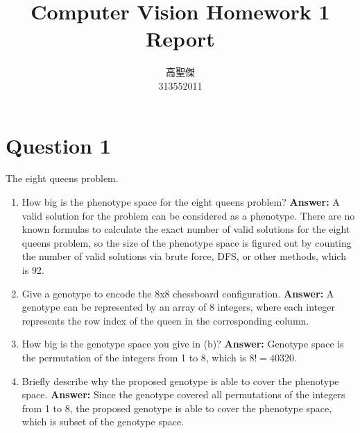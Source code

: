 \documentclass[12pt,letterpaper]{article}
\newcommand{\xAns}{\vskip 2mm\textbf{Answer:} }
\begin{document}
\begin{CJK}{UTF8}{bkai}
    \title{Computer Vision Homework 1 Report}

    \author{
        高聖傑\\
        313552011\\
    }

    \maketitle
\end{CJK}

\section*{Question 1}
The eight queens problem.
\begin{enumerate}[label=(\alph*)]
    \item How big is the phenotype space for the eight queens problem? \xAns A valid solution for the problem can be considered as a phenotype. There are no known formulas to calculate the exact number of valid solutions for the eight queens problem, so the size of the phenotype space is figured out by counting the number of valid solutions via brute force, DFS, or other methods, which is $92$.
    \item Give a genotype to encode the 8x8 chessboard configuration. \xAns A genotype can be represented by an array of 8 integers, where each integer represents the row index of the queen in the corresponding column.
    \item How big is the genotype space you give in (b)? \xAns Genotype space is the permutation of the integers from 1 to 8, which is $8! = 40320$.
    \item Briefly describe why the proposed genotype is able to cover the phenotype space. \xAns Since the genotype covered all permutations of the integers from 1 to 8, the proposed genotype is able to cover the phenotype space, which is subset of the genotype space.
\end{enumerate}
\end{document}
